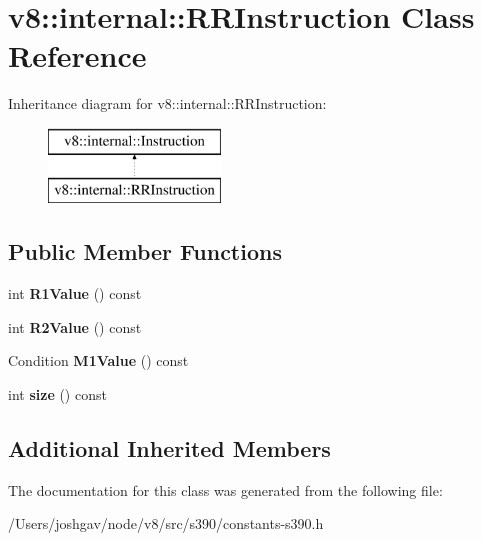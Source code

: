 \hypertarget{classv8_1_1internal_1_1_r_r_instruction}{}\section{v8\+:\+:internal\+:\+:R\+R\+Instruction Class Reference}
\label{classv8_1_1internal_1_1_r_r_instruction}
Inheritance diagram for v8\+:\+:internal\+:\+:R\+R\+Instruction\+:\begin{figure}[H]
\begin{center}
\leavevmode
\includegraphics[height=2.000000cm]{classv8_1_1internal_1_1_r_r_instruction}
\end{center}
\end{figure}
\subsection*{Public Member Functions}
\begin{DoxyCompactItemize}
\item 
int {\bfseries R1\+Value} () const \hypertarget{classv8_1_1internal_1_1_r_r_instruction_aec533fe4f507546d66fee16a9b5f851e}{}\label{classv8_1_1internal_1_1_r_r_instruction_aec533fe4f507546d66fee16a9b5f851e}

\item 
int {\bfseries R2\+Value} () const \hypertarget{classv8_1_1internal_1_1_r_r_instruction_ab5b7cb86aa545a337528315ac3bac015}{}\label{classv8_1_1internal_1_1_r_r_instruction_ab5b7cb86aa545a337528315ac3bac015}

\item 
Condition {\bfseries M1\+Value} () const \hypertarget{classv8_1_1internal_1_1_r_r_instruction_a64af371e50a93bbc0761afedba1371fd}{}\label{classv8_1_1internal_1_1_r_r_instruction_a64af371e50a93bbc0761afedba1371fd}

\item 
int {\bfseries size} () const \hypertarget{classv8_1_1internal_1_1_r_r_instruction_aeae0b0ed534f842a6f4b68b8db2647f8}{}\label{classv8_1_1internal_1_1_r_r_instruction_aeae0b0ed534f842a6f4b68b8db2647f8}

\end{DoxyCompactItemize}
\subsection*{Additional Inherited Members}


The documentation for this class was generated from the following file\+:\begin{DoxyCompactItemize}
\item 
/\+Users/joshgav/node/v8/src/s390/constants-\/s390.\+h\end{DoxyCompactItemize}

